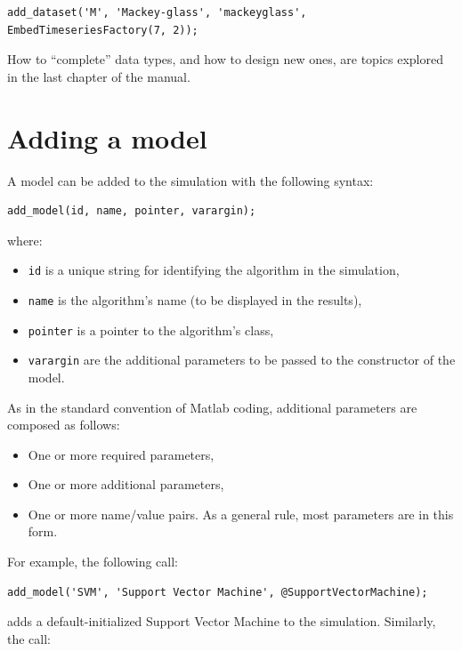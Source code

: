 \begin{lstlisting}
add_dataset('M', 'Mackey-glass', 'mackeyglass', EmbedTimeseriesFactory(7, 2));
\end{lstlisting}

How to ``complete'' data types, and how to design new ones, are topics explored in the last chapter of the manual.

\section{Adding a model}

A model can be added to the simulation with the following syntax:

\begin{lstlisting}
add_model(id, name, pointer, varargin);
\end{lstlisting}

\noindent where:

\begin{itemize}
	\item \verb|id| is a unique string for identifying the algorithm in the simulation,
	\item \verb|name| is the algorithm's name (to be displayed in the results),
	\item \verb|pointer| is a pointer to the algorithm's class,
	\item \verb|varargin| are the additional parameters to be passed to the constructor of the model.
\end{itemize}

\noindent As in the standard convention of Matlab coding, additional parameters are composed as follows:

\begin{itemize}
	\item One or more required parameters,
	\item One or more additional parameters,
	\item One or more name/value pairs. As a general rule, most parameters are in this form.
\end{itemize}

\noindent For example, the following call:

\begin{lstlisting}
add_model('SVM', 'Support Vector Machine', @SupportVectorMachine);
\end{lstlisting}

\noindent adds a default-initialized Support Vector Machine to the simulation. Similarly, the call:

